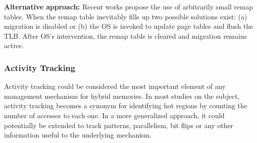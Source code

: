 
	\textbf{Alternative approach:} Recent works  propose the use of arbitrarily small remap tables. When the remap table inevitably fills up two possible solutions exist: (a) migration is disabled or (b) the OS is invoked to update page tables and flush the TLB. After OS's intervention, the remap table is cleared and migration remains active.


%


\subsubsection{Activity Tracking}
\label{sec:tracking}

Activity tracking could be considered the most important element of any management mechanism for hybrid memories. In most studies on the subject, activity tracking becomes a synonym for identifying hot regions by counting the number of accesses to each one. In a more generalized approach, it could potentially be extended to track patterns, parallelism, bit flips or any other information useful to the underlying mechanism. %

